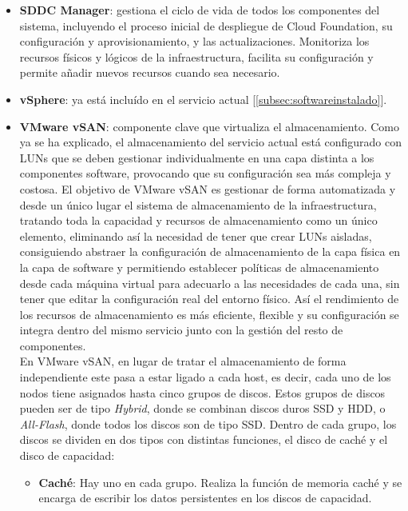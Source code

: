 \begin{itemize}
    \item \textbf{SDDC Manager}: gestiona el ciclo de vida de todos los componentes del sistema, incluyendo el proceso inicial de despliegue de Cloud Foundation, su configuración y aprovisionamiento, y las actualizaciones. Monitoriza los recursos físicos y lógicos de la infraestructura, facilita su configuración y permite añadir nuevos recursos cuando sea necesario. 
    \item \textbf{vSphere}: ya está incluído en el servicio actual [\ref{subsec:softwareinstalado}].
    \item \textbf{VMware vSAN}: componente clave que virtualiza el almacenamiento. Como ya se ha explicado, el almacenamiento del servicio actual está configurado con LUNs que se deben gestionar individualmente en una capa distinta a los componentes software, provocando que su configuración sea más compleja y costosa. El objetivo de VMware vSAN es gestionar de forma automatizada y desde un único lugar el sistema de almacenamiento de la infraestructura, tratando toda la capacidad y recursos de almacenamiento como un único elemento, eliminando así la necesidad de tener que crear LUNs aisladas, consiguiendo abstraer la configuración de almacenamiento de la capa física en la capa de software y permitiendo establecer políticas de almacenamiento desde cada máquina virtual para adecuarlo a las necesidades de cada una, sin tener que editar la configuración real del entorno físico. Así el rendimiento de los recursos de almacenamiento es más eficiente, flexible y su configuración se integra dentro del mismo servicio junto con la gestión del resto de componentes. \\
    En VMware vSAN, en lugar de tratar el almacenamiento de forma independiente este pasa a estar ligado a cada host, es decir, cada uno de los nodos tiene asignados hasta cinco grupos de discos. Estos grupos de discos pueden ser de tipo \textit{Hybrid}, donde se combinan discos duros SSD y HDD, o \textit{All-Flash}, donde todos los discos son de tipo SSD. Dentro de cada grupo, los discos se dividen en dos tipos con distintas funciones, el disco de caché y el disco de capacidad\cite{operacionesVSAN}:
        \begin{itemize}
            \item \textbf{Caché}: Hay uno en cada grupo. Realiza la función de memoria caché y se encarga de escribir los datos persistentes en los discos de capacidad.

\end{itemize}
\end{itemize}
